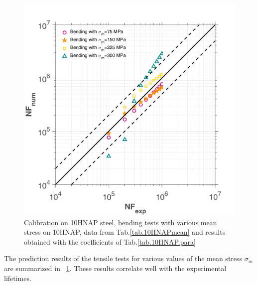 \documentclass[3p,times,procedia,number]{elsarticle}
\newcommand{\figref}[1]{\figurename~\ref{#1}}
\begin{document}
\begin{figure}[!h]
	\centering
	\includegraphics[width=\textwidth]{figures//10HNAP_b1D_m_err.png} 
	\caption{Calibration on 10HNAP steel, bending tests with various mean stress on 10HNAP, data from Tab.\ref{tab.10HNAPmean}  and results obtained with the coefficients of Tab.\ref{tab.10HNAP.para}}
	\label{fig.10HNAP2}
\end{figure}


The prediction results of the tensile tests for various values of the mean stress $\sigma_m$ are summarized in \figref{fig.10HNAP2}. These results correlate well with the experimental lifetimes. 
\end{document}
